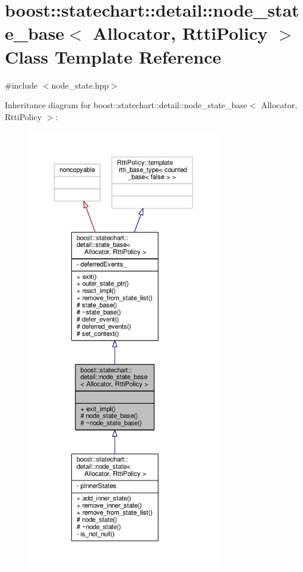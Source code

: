 \hypertarget{classboost_1_1statechart_1_1detail_1_1node__state__base}{}\section{boost\+:\+:statechart\+:\+:detail\+:\+:node\+\_\+state\+\_\+base$<$ Allocator, Rtti\+Policy $>$ Class Template Reference}
\label{classboost_1_1statechart_1_1detail_1_1node__state__base}


{\ttfamily \#include $<$node\+\_\+state.\+hpp$>$}



Inheritance diagram for boost\+:\+:statechart\+:\+:detail\+:\+:node\+\_\+state\+\_\+base$<$ Allocator, Rtti\+Policy $>$\+:
\nopagebreak
\begin{figure}[H]
\begin{center}
\leavevmode
\includegraphics[height=550pt]{classboost_1_1statechart_1_1detail_1_1node__state__base__inherit__graph}
\end{center}
\end{figure}



